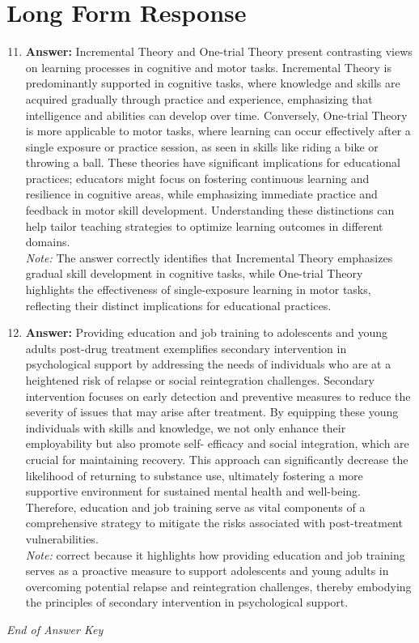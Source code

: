 \documentclass[12pt]{article}
\begin{document}
\section*{Long Form Response}
\begin{enumerate}[label=\arabic*.]
\setcounter{enumi}{10}
\item \textbf{Answer:} Incremental Theory and One-trial Theory present contrasting views on learning processes in cognitive and motor tasks. Incremental Theory is predominantly supported in cognitive tasks, where knowledge and skills are acquired gradually through practice and experience, emphasizing that intelligence and abilities can develop over time. Conversely, One-trial Theory is more applicable to motor tasks, where learning can occur effectively after a single exposure or practice session, as seen in skills like riding a bike or throwing a ball. These theories have significant implications for educational practices; educators might focus on fostering continuous learning and resilience in cognitive areas, while emphasizing immediate practice and feedback in motor skill development. Understanding these distinctions can help tailor teaching strategies to optimize learning outcomes in different domains.
\\ \textit{Note:} The answer correctly identifies that Incremental Theory emphasizes gradual skill development in cognitive tasks, while One-trial Theory highlights the effectiveness of single-exposure learning in motor tasks, reflecting their distinct implications for educational practices.
\item \textbf{Answer:} Providing education and job training to adolescents and young adults post-drug treatment exemplifies secondary intervention in psychological support by addressing the needs of individuals who are at a heightened risk of relapse or social reintegration challenges. Secondary intervention focuses on early detection and preventive measures to reduce the severity of issues that may arise after treatment. By equipping these young individuals with skills and knowledge, we not only enhance their employability but also promote self- efficacy and social integration, which are crucial for maintaining recovery. This approach can significantly decrease the likelihood of returning to substance use, ultimately fostering a more supportive environment for sustained mental health and well-being. Therefore, education and job training serve as vital components of a comprehensive strategy to mitigate the risks associated with post-treatment vulnerabilities.
\\ \textit{Note:} correct because it highlights how providing education and job training serves as a proactive measure to support adolescents and young adults in overcoming potential relapse and reintegration challenges, thereby embodying the principles of secondary intervention in psychological support.
\end{enumerate}

\vfill
\noindent\textit{End of Answer Key}
\end{document}
